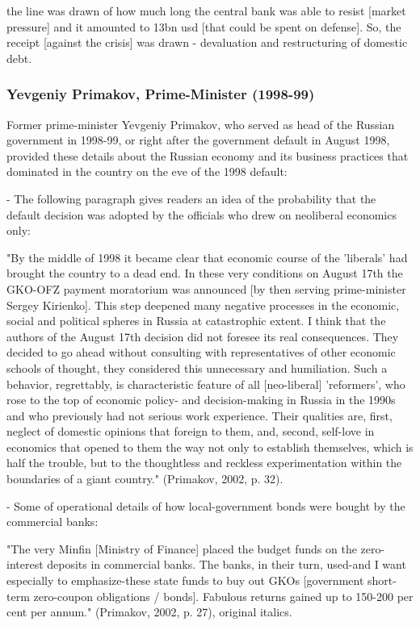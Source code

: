 the line was drawn of how much long the central bank was able to resist [market pressure] and it amounted to 13bn \ac{usd} [that could be spent on defense]. So, the receipt [against the crisis] was drawn - devaluation and restructuring of domestic debt.

\subsubsection{Yevgeniy Primakov, Prime-Minister (1998-99)}

Former prime-minister Yevgeniy Primakov, who served as head of the Russian government in 1998-99, or right after the government default in August 1998, provided these details about the Russian economy and its business practices that dominated in the country on the eve of the 1998 default:

- The following paragraph gives readers an idea of the probability that the default decision was adopted by the officials who drew on neoliberal economics only:

"By the middle of 1998 it became clear that economic course of the 'liberals' had brought the country to a dead end. In these very conditions on August 17th the GKO-OFZ payment moratorium was announced [by then serving prime-minister Sergey Kirienko]. This step deepened many negative processes in the economic, social and political spheres in Russia at catastrophic extent. I think that the authors of the August 17th decision did not foresee its real consequences. They decided to go ahead without consulting with representatives of other economic schools of thought, they considered this unnecessary and humiliation. Such a behavior, regrettably, is characteristic feature of all [neo-liberal] 'reformers', who rose to the top of economic policy- and decision-making in Russia in the 1990s and who previously had not serious work experience. Their qualities are, first, neglect of domestic opinions that foreign to them, and, second, self-love in economics that opened to them the way not only to establish themselves, which is half the trouble, but to the thoughtless and reckless experimentation within the boundaries of a giant country." (Primakov, 2002, p. 32).

- Some of operational details of how local-government bonds were bought by the commercial banks:

"The very Minfin [Ministry of Finance] placed the budget funds on the zero-interest deposits in commercial banks. The banks, in their turn, used-and I want especially to emphasize-these state funds to buy out GKOs [government short-term zero-coupon obligations / bonds]. Fabulous returns gained up to 150-200 per cent per annum." 
(Primakov, 2002, p. 27), original italics.

